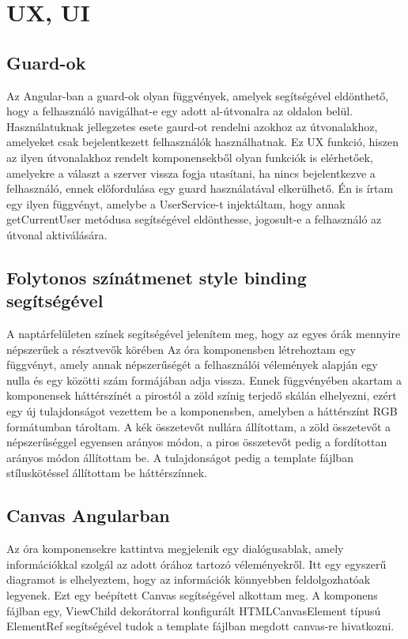 \documentclass[a4paper,12pt]{report}
\theoremstyle{definition}
\theoremstyle{remark}
\begin{document}
\section{UX, UI}

	\subsection{Guard-ok}

Az Angular-ban a guard-ok olyan függvények, amelyek segítségével eldönthető, hogy a felhasználó navigálhat-e egy adott al-útvonalra az oldalon belül. Használatuknak jellegzetes esete gaurd-ot rendelni azokhoz az útvonalakhoz, amelyeket csak bejelentkezett felhasználók használhatnak. Ez UX funkció, hiszen az ilyen útvonalakhoz rendelt komponensekből olyan funkciók is elérhetőek, amelyekre a választ a szerver vissza fogja utasítani, ha nincs bejelentkezve a felhasználó, ennek előfordulása egy guard használatával elkerülhető. Én is írtam egy ilyen függvényt, amelybe a UserService-t injektáltam, hogy annak getCurrentUser metódusa segítségével eldönthesse, jogosult-e a felhasználó az útvonal aktiválására.

	\subsection{Folytonos színátmenet style binding segítségével}

A naptárfelületen színek segítségével jelenítem meg, hogy az egyes órák mennyire népszerűek a résztvevők körében Az óra komponensben létrehoztam egy függvényt, amely annak népszerűségét a felhasználói vélemények alapján egy nulla és egy közötti szám formájában adja vissza. Ennek függvényében akartam a komponensek háttérszínét a pirostól a zöld színig terjedő skálán elhelyezni, ezért egy új tulajdonságot vezettem be a komponensben, amelyben a háttérszínt RGB formátumban tároltam. A kék összetevőt nullára állítottam, a zöld összetevőt a népszerűséggel egyensen arányos módon, a piros összetevőt pedig a fordítottan arányos módon állítottam be. A tulajdonságot pedig a template fájlban stíluskötéssel állítottam be háttérszínnek.

	\subsection{Canvas Angularban}

Az óra komponensekre kattintva megjelenik egy dialógusablak, amely információkkal szolgál az adott órához tartozó véleményekről. Itt egy egyszerű diagramot is elhelyeztem, hogy az információk könnyebben feldolgozhatóak legyenek. Ezt egy beépített Canvas segítségével alkottam meg. A komponens fájlban egy, ViewChild dekorátorral konfigurált HTMLCanvasElement típusú ElementRef segítségével tudok a template fájlban megdott canvas-re hivatkozni.
\end{document}
